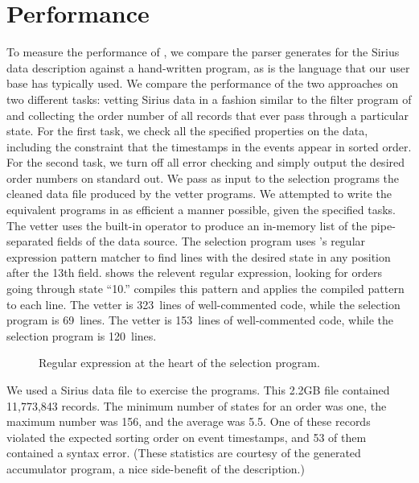 \documentclass{sig-alternate}
\newcommand{\dibbler}{Sirius}
\begin{document}
\section{Performance}
To measure the performance of \pads{}, we compare the parser \pads{} generates for the \dibbler{} data description against a hand-written \perl{} program, as \perl{} is the language that our user base has typically used. We compare the performance of the two approaches on two different tasks: vetting \dibbler{} data in a fashion similar to the filter program of
 and collecting the order number of all records that ever pass through a particular state.  For the first task, we check all the specified properties on the data, including the constraint that the timestamps in the events appear in sorted order.  For the second task, we turn off all error checking and simply output the desired order numbers on standard out.
We pass as input to the selection programs the cleaned data file produced by the vetter programs. 
We attempted to write the equivalent \perl{} programs in as efficient a manner possible, given the specified tasks.  The \perl{} vetter uses the built-in  operator to produce an in-memory list of the pipe-separated fields of the data source.  The \perl{} selection program uses \perl{}'s regular expression pattern matcher to find lines with the desired state in any 
position after the 13th field.   shows the relevent regular expression, looking for orders going through state ``10.''
\perl{} compiles this pattern and applies the compiled pattern to each line.  The \perl{} vetter is 323~lines of well-commented \perl{} code, while the selection program is 69~lines.  
The \pads{} vetter is 153~lines of well-commented \C{} code, while the \pads{} selection program is 120~lines. 

\begin{figure*}
\caption{Regular expression at the heart of the \perl{} selection program.}
\label{figure:perl-re}
\end{figure*}

We used a \dibbler{} data file to exercise the programs.  This 2.2GB file contained 11,773,843 records.  The minimum number of states for an order was one, the maximum number was 156, and the average was 5.5.  One of these records violated the expected sorting order on event timestamps, and 53 of them contained a syntax error.
(These statistics are courtesy of the generated \pads{} accumulator program, a nice side-benefit of the \pads{} description.)  
\end{document}
